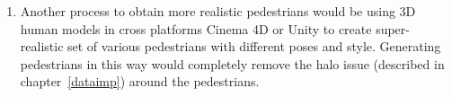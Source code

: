 \begin{enumerate}
	\item Another process to obtain more realistic pedestrians would be using 3D human models in cross platforms Cinema 4D or Unity to create super-realistic set of various pedestrians with different poses and style. Generating pedestrians in this way would completely remove the halo issue (described in chapter~\ref{dataimp}) around the pedestrians. 
\end{enumerate}  


